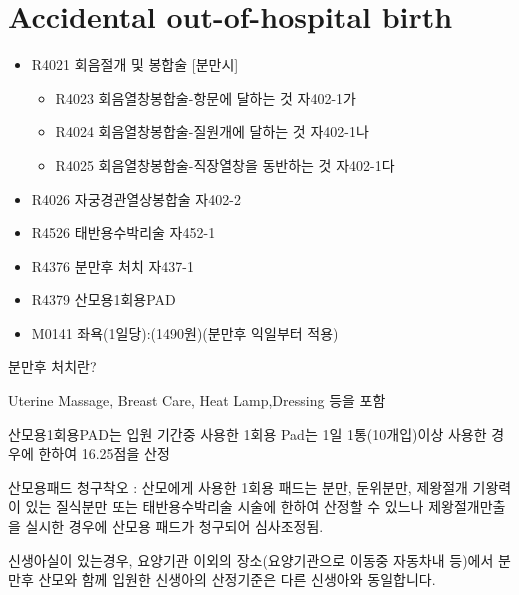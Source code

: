 \section{Accidental out-of-hospital birth}
\begin{paracol}{2}
\setlength{\columnseprule}{0.4pt}
\setlength{\columnsep}{2em}
\begin{leftcolumn}
\begin{commentbox}{}
\begin{itemize}\tightlist
\item[\dsjuridical] R4021 회음절개 및 봉합술 [분만시]
	\begin{itemize}\tightlist
	\item R4023 회음열창봉합술-항문에 달하는 것 자402-1가 
	\item R4024 회음열창봉합술-질원개에 달하는 것 자402-1나 
	\item R4025 회음열창봉합술-직장열창을 동반하는 것 자402-1다 
	\end{itemize}
\item[\dsmedical] R4026 자궁경관열상봉합술 자402-2 
\item[\dsmedical] R4526 태반용수박리술 자452-1 
\item[\dsmedical] R4376 분만후 처치 자437-1 
\item[\dsmedical] R4379 산모용1회용PAD 
\item[\dsmedical] M0141 좌욕(1일당):(1490원)(분만후 익일부터 적용)
\end{itemize}
\end{commentbox}

\end{leftcolumn}

\begin{rightcolumn}
\textsf{분만후 처치란?} \par
\noindent Uterine Massage, Breast Care, Heat Lamp,Dressing 등을 포함\par
\noindent\textsf{산모용1회용PAD}는 입원 기간중 사용한 1회용 Pad는 1일 1통(10개입)이상 사용한 경우에 한하여 16.25점을 산정\par
\noindent 산모용패드 청구착오 : 산모에게 사용한 1회용 패드는 분만, 둔위분만, 제왕절개 기왕력이 있는 질식분만 또는 태반용수박리술 시술에 한하여 산정할 수 있느나 제왕절개만출을 실시한 경우에 산모용 패드가 청구되어 심사조정됨.\par
\noindent\textsf{신생아실이 있는경우}, 요양기관 이외의 장소(요양기관으로 이동중 자동차내 등)에서 분만후 산모와 함께 입원한 신생아의 산정기준은 다른 신생아와 동일합니다.
\end{rightcolumn}
\end{paracol} 
